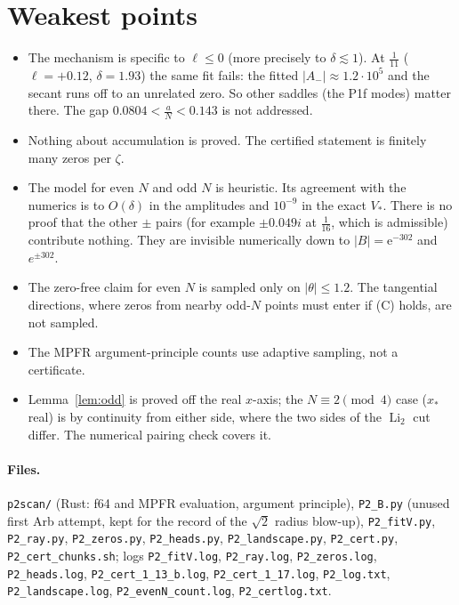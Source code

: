 \documentclass[11pt]{article}
\theoremstyle{remark}\newtheorem{remark}[theorem]{Remark}
\newcommand{\e}{\mathrm{e}}
\newcommand{\Li}{\operatorname{Li}_2}
\begin{document}
\section*{Weakest points}
\begin{itemize}
\item The mechanism is specific to $\ell\le0$ (more precisely to $\delta\lesssim1$). At $\frac1{11}$ ($\ell=+0.12$, $\delta=1.93$) the same fit fails: the 
fitted $|A_-|\approx1.2\cdot10^5$ and the secant runs off to an unrelated zero. So other saddles (the P1f modes) matter there. The gap
$0.0804<\frac aN<0.143$ is not addressed.
\item Nothing about accumulation is proved. The certified statement is finitely many zeros per $\zeta$.
\item The model for even $N$ and odd $N$ is heuristic. Its agreement with the numerics is to $O(\delta)$ in the amplitudes and $10^{-9}$ in the exact $V_*$.
There is no proof that the other $\pm$ pairs (for example $\pm0.049i$ at $\frac1{16}$, which is admissible) contribute nothing. They are
invisible numerically down to $|B|=\e^{-302}$ and $e^{\pm302}$.
\item The zero-free claim for even $N$ is sampled only on $|\theta|\le1.2$. The tangential directions, where zeros from nearby odd-$N$
points must enter if (C) holds, are not sampled.
\item The MPFR argument-principle counts use adaptive sampling, not a certificate.
\item Lemma~\ref{lem:odd} is proved off the real $x$-axis; the $N\equiv2\pmod4$ case ($x_*$ real) is by continuity from either side,
where the two sides of the $\Li$ cut differ. The numerical pairing check covers it.
\end{itemize}

\paragraph{Files.} \texttt{p2scan/} (Rust: f64 and MPFR evaluation, argument principle), \texttt{P2\_B.py} (unused first Arb
attempt, kept for the record of the $\sqrt2$ radius blow-up), \texttt{P2\_fitV.py}, \texttt{P2\_ray.py}, \texttt{P2\_zeros.py},
\texttt{P2\_heads.py}, \texttt{P2\_landscape.py}, \texttt{P2\_cert.py}, \texttt{P2\_cert\_chunks.sh}; logs \texttt{P2\_fitV.log}, \texttt{P2\_ray.log},
\texttt{P2\_zeros.log}, \texttt{P2\_heads.log}, \texttt{P2\_cert\_1\_13\_b.log}, \texttt{P2\_cert\_1\_17.log}, \texttt{P2\_log.txt}, \texttt{P2\_landscape.log},
\texttt{P2\_evenN\_count.log}, \texttt{P2\_certlog.txt}.
\end{document}
